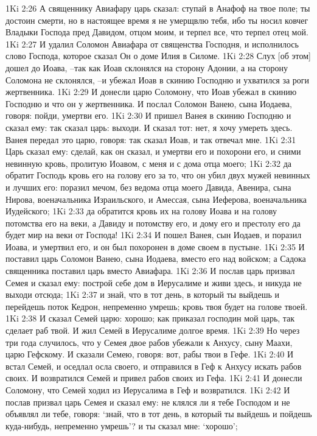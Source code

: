 1Ki 2:26  А священнику Авиафару царь сказал: ступай в Анафоф на твое поле; ты достоин смерти, но в настоящее время я не умерщвлю тебя, ибо ты носил ковчег Владыки Господа пред Давидом, отцом моим, и терпел все, что терпел отец мой.
1Ki 2:27  И удалил Соломон Авиафара от священства Господня, и исполнилось слово Господа, которое сказал Он о доме Илия в Силоме.
1Ki 2:28  Слух [об этом] дошел до Иоава, --так как Иоав склонялся на сторону Адонии, а на сторону Соломона не склонялся, --и убежал Иоав в скинию Господню и ухватился за роги жертвенника.
1Ki 2:29  И донесли царю Соломону, что Иоав убежал в скинию Господню и что он у жертвенника. И послал Соломон Ванею, сына Иодаева, говоря: пойди, умертви его.
1Ki 2:30  И пришел Ванея в скинию Господню и сказал ему: так сказал царь: выходи. И сказал тот: нет, я хочу умереть здесь. Ванея передал это царю, говоря: так сказал Иоав, и так отвечал мне.
1Ki 2:31  Царь сказал ему: сделай, как он сказал, и умертви его и похорони его, и сними невинную кровь, пролитую Иоавом, с меня и с дома отца моего;
1Ki 2:32  да обратит Господь кровь его на голову его за то, что он убил двух мужей невинных и лучших его: поразил мечом, без ведома отца моего Давида, Авенира, сына Нирова, военачальника Израильского, и Амессая, сына Иеферова, военачальника Иудейского;
1Ki 2:33  да обратится кровь их на голову Иоава и на голову потомства его на веки, а Давиду и потомству его, и дому его и престолу его да будет мир на веки от Господа!
1Ki 2:34  И пошел Ванея, сын Иодаев, и поразил Иоава, и умертвил его, и он был похоронен в доме своем в пустыне.
1Ki 2:35  И поставил царь Соломон Ванею, сына Иодаева, вместо его над войском; а Садока священника поставил царь вместо Авиафара.
1Ki 2:36  И послав царь призвал Семея и сказал ему: построй себе дом в Иерусалиме и живи здесь, и никуда не выходи отсюда;
1Ki 2:37  и знай, что в тот день, в который ты выйдешь и перейдешь поток Кедрон, непременно умрешь; кровь твоя будет на голове твоей.
1Ki 2:38  И сказал Семей царю: хорошо; как приказал господин мой царь, так сделает раб твой. И жил Семей в Иерусалиме долгое время.
1Ki 2:39  Но через три года случилось, что у Семея двое рабов убежали к Анхусу, сыну Маахи, царю Гефскому. И сказали Семею, говоря: вот, рабы твои в Гефе.
1Ki 2:40  И встал Семей, и оседлал осла своего, и отправился в Геф к Анхусу искать рабов своих. И возвратился Семей и привел рабов своих из Гефа.
1Ki 2:41  И донесли Соломону, что Семей ходил из Иерусалима в Геф и возвратился.
1Ki 2:42  И послав призвал царь Семея и сказал ему: не клялся ли я тебе Господом и не объявлял ли тебе, говоря: `знай, что в тот день, в который ты выйдешь и пойдешь куда-нибудь, непременно умрешь'? и ты сказал мне: `хорошо';
